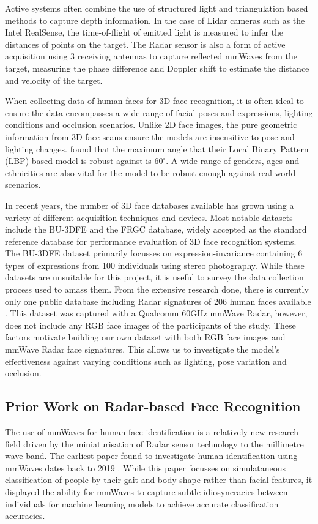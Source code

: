 \documentclass{interim}
\begin{document}
Active systems often combine the use of structured light and triangulation based methods to capture depth information. In the case of Lidar cameras such as the Intel RealSense, the time-of-flight of emitted light is measured to infer the distances of points on the target. The Radar sensor is also a form of active acquisition using 3 receiving antennas to capture reflected mmWaves from the target, measuring the phase difference and Doppler shift to estimate the distance and velocity of the target. 

When collecting data of human faces for 3D face recognition, it is often ideal to ensure the data encompasses a wide range of facial poses and expressions, lighting conditions and occlusion scenarios. Unlike 2D face images, the pure geometric information from 3D face scans ensure the models are insensitive to pose and lighting changes. \cite{prabhu2011unconstrained} found that the maximum angle that their Local Binary Pattern (LBP) based model is robust against is $60^\circ$. A wide range of genders, ages and ethnicities are also vital for the model to be robust enough against real-world scenarios.

In recent years, the number of 3D face databases available has grown using a variety of different acquisition techniques and devices. Most notable datasets include the BU-3DFE \cite{yin20063d} and the FRGC \cite{phillips2005overview} database, widely accepted as the standard reference database for performance evaluation of 3D face recognition systems. The BU-3DFE dataset primarily focusses on expression-invariance containing 6 types of expressions from 100 individuals using stereo photography. While these datasets are unsuitable for this project, it is useful to survey the data collection process used to amass them. From the extensive research done, there is currently only one public database including Radar signatures of 206 human faces available \cite{mmwavefacedata}. This dataset was captured with a Qualcomm 60GHz mmWave Radar, however, does not include any RGB face images of the participants of the study. These factors motivate building our own dataset with both RGB face images and mmWave Radar face signatures. This allows us to investigate the model's effectiveness against varying conditions such as lighting, pose variation and occlusion.

\subsection{Prior Work on Radar-based Face Recognition}
The use of mmWaves for human face identification is a relatively new research field driven by the miniaturisation of Radar sensor technology to the millimetre wave band. The earliest paper found to investigate human identification using mmWaves dates back to 2019 \cite{zhao2019mid}. While this paper focusses on simulataneous classification of people by their gait and body shape rather than facial features, it displayed the ability for mmWaves to capture subtle idiosyncracies between individuals for machine learning models to achieve accurate classification accuracies.  
\end{document}
